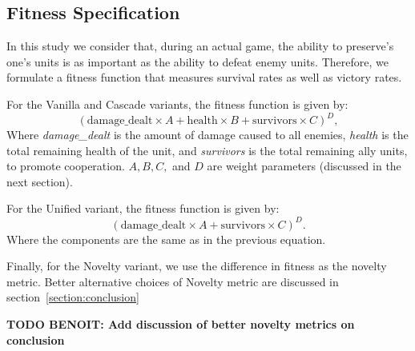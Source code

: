 \subsection{Fitness Specification}

In this study we consider that, during an actual game, the ability
to preserve's one's units is as important as the ability to defeat
enemy units. Therefore, we formulate a fitness function that
measures survival rates as well as victory rates.

For the Vanilla and Cascade variants, the fitness function is
given by:
\begin{equation}\label{eq:fitness_unit}
  (\text{damage\_dealt} \times A + \text{health} \times B +
  \text{survivors} \times C)^D,
\end{equation}
Where \emph{damage\_dealt} is the amount of damage caused to all
enemies, \emph{health} is the total remaining health of the unit, and
\emph{survivors} is the total remaining ally units, to promote
cooperation. $A, B, C,$ and $D$ are weight parameters (discussed in
the next section).

For the Unified variant, the fitness function is given by:
\begin{equation}\label{eq:fitness_group}
  (\text{damage\_dealt} \times A + \text{survivors} \times C)^D.
\end{equation}
Where the components are the same as in the previous equation.

Finally, for the Novelty variant, we use the difference in fitness as
the novelty metric. Better alternative choices of Novelty metric are
discussed in section~\ref{section:conclusion}

{\bf TODO BENOIT: Add discussion of better novelty metrics on conclusion}

